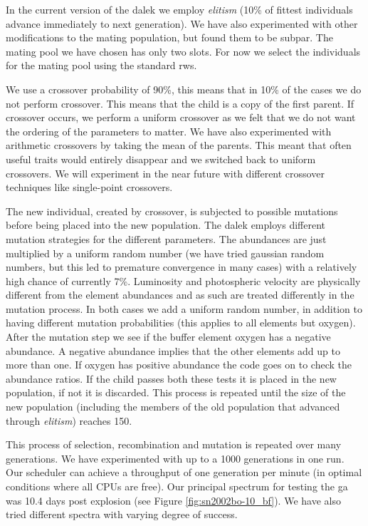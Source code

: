 In the current version of the \gls{dalek} we employ \textit{elitism} (10\% of fittest individuals advance immediately to next generation). We have also experimented with other modifications to the mating population, but found them to be subpar. The mating pool we have chosen has only two slots. For now we select the individuals for the mating pool using the standard \gls{rws}. 

We use a \gls{crossover} probability of 90\%, this means that in 10\% of the cases we do not perform \gls{crossover}. This means that the child is a copy of the first parent. If \gls{crossover} occurs, we perform a uniform crossover as we felt that we do not want the ordering of the parameters to matter. We have also experimented with arithmetic \glspl{crossover} by taking the mean of the parents. This meant that often useful traits would entirely disappear and we switched back to uniform \glspl{crossover}. We will experiment in the near future with different crossover techniques like single-point \glspl{crossover}. 

The new individual, created by crossover, is subjected to possible mutations before being placed into the new population. The \gls{dalek} employs different mutation strategies for the different parameters. The abundances are just multiplied by a uniform random number (we have tried gaussian random numbers, but this led to premature convergence in many cases) with a relatively high chance of currently 7\%. Luminosity and photospheric velocity are physically different from the element abundances and as such are treated differently in the mutation process. In both cases we add a uniform random number, in addition to having different mutation probabilities (this applies to all elements but oxygen). After the mutation step we see if the buffer element oxygen has a negative abundance. A negative abundance implies that the other elements add up to more than one. If oxygen has positive abundance the code goes on to check the abundance ratios. If the child passes both these tests it is placed in the new population, if not it is discarded. This process is repeated until the size of the new population (including the members of the old population that advanced through \textit{elitism}) reaches 150.

This process of selection, recombination and mutation is repeated over many generations. We have experimented with up to a 1000 generations in one run. Our scheduler can achieve a throughput of one generation per minute (in optimal conditions where all CPUs are free). 
Our principal spectrum for testing the \gls{ga} was  10.4 days post explosion (see Figure \ref{fig:sn2002bo-10_bf}). We have also tried different spectra with varying degree of success.

